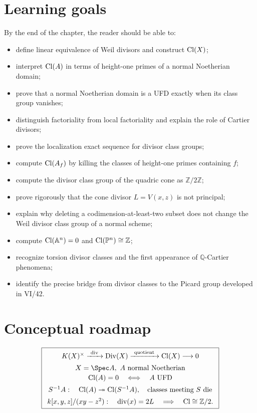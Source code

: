 \section*{Learning goals}
By the end of the chapter, the reader should be able to:
\begin{itemize}
\item define linear equivalence of Weil divisors and construct \(\operatorname{Cl}(X)\);
\item interpret \(\operatorname{Cl}(A)\) in terms of height-one primes of a normal Noetherian domain;
\item prove that a normal Noetherian domain is a UFD exactly when its class group vanishes;
\item distinguish factoriality from local factoriality and explain the role of Cartier divisors;
\item prove the localization exact sequence for divisor class groups;
\item compute \(\operatorname{Cl}(A_f)\) by killing the classes of height-one primes containing \(f\);
\item compute the divisor class group of the quadric cone as \(\mathbb Z/2\mathbb Z\);
\item prove rigorously that the cone divisor \(L=V(x,z)\) is not principal;
\item explain why deleting a codimension-at-least-two subset does not change the Weil divisor class group of a normal scheme;
\item compute \(\operatorname{Cl}(\mathbb A^n)=0\) and \(\operatorname{Cl}(\mathbb P^n)\cong\mathbb Z\);
\item recognize torsion divisor classes and the first appearance of \(\mathbb Q\)-Cartier phenomena;
\item identify the precise bridge from divisor classes to the Picard group developed in VI/42.
\end{itemize}

\section*{Conceptual roadmap}
\[
\boxed{
\begin{array}{c}
K(X)^\times
\xrightarrow{\ \operatorname{div}\ }
\Div(X)
\xrightarrow{\ \text{quotient}\ }
\Cl(X)
\longrightarrow 0
\\[5pt]
X=\Spec A,\ A\ \text{normal Noetherian}
\\[2pt]
\Cl(A)=0
\quad\Longleftrightarrow\quad
A\ \text{UFD}
\\[5pt]
S^{-1}A:
\quad
\Cl(A)\twoheadrightarrow\Cl(S^{-1}A),
\quad
\text{classes meeting }S\text{ die}
\\[5pt]
k[x,y,z]/(xy-z^2):
\quad
\operatorname{div}(x)=2L
\quad\Longrightarrow\quad
\Cl\cong\mathbb Z/2.
\end{array}}
\]


